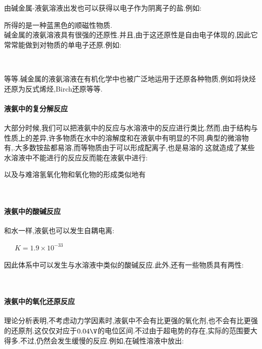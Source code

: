 \documentclass{ctexart}
\begin{document}
\indent 由碱金属-液氨溶液出发也可以获得以电子作为阴离子的盐.例如:
\begin{center}
\end{center}
所得的是一种蓝黑色的顺磁性物质.\\
\indent 碱金属的液氨溶液具有很强的还原性.并且,由于这还原性是自由电子体现的,因此它常常能做到对物质的单电子还原.例如:
\begin{center}
    \\
\end{center}
等等.碱金属的液氨溶液在有机化学中也被广泛地运用于还原各种物质,例如将炔烃还原为反式烯烃,Birch还原等等.
\paragraph{液氨中的复分解反应}
大部分时候,我们可以把液氨中的反应与水溶液中的反应进行类比.然而,由于结构与性质上的差异,许多物质在水中的溶解度和在液氨中有明显的不同.典型的微溶物有,.大多数铵盐都易溶,而等物质由于可以形成配离子,也是易溶的.这就造成了某些水溶液中不能进行的反应反而能在液氨中进行:
\begin{center}
\end{center}
以及与难溶氢氧化物和氧化物的形成类似地有
\begin{center}
    \\
\end{center}
\paragraph{液氨中的酸碱反应}
和水一样,液氨也可以发生自耦电离:
\begin{center}
    \ \ \ $K=1.9\times10^{-33}$
\end{center}
因此体系中可以发生与水溶液中类似的酸碱反应.此外,还有一些物质具有两性:
\begin{center}
    \\
\end{center}
\paragraph{液氨中的氧化还原反应}
理论分析表明,不考虑动力学因素时,液氨中不会有比更强的氧化剂,也不会有比更强的还原剂.这仅仅对应于$0.04\V$的电位区间.不过由于超电势的存在,实际的范围要大得多.不过,仍然会发生缓慢的反应.例如,在碱性溶液中放出:
\begin{center}
\end{center}
\end{document}

